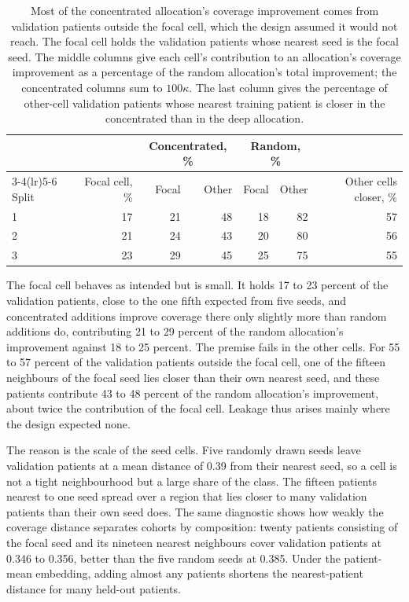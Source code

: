 \begin{table}[htbp]
\centering
\renewcommand{\arraystretch}{1.15}
\begin{tabular}{@{}lrrrrrr@{}}
\toprule
 & & \multicolumn{2}{c}{Concentrated, \%} & \multicolumn{2}{c}{Random, \%} & \\
\cmidrule(lr){3-4}\cmidrule(lr){5-6}
Split & Focal cell, \% & Focal & Other & Focal & Other & Other cells closer, \% \\
\midrule
1 & 17 & 21 & 48 & 18 & 82 & 57 \\
2 & 21 & 24 & 43 & 20 & 80 & 56 \\
3 & 23 & 29 & 45 & 25 & 75 & 55 \\
\bottomrule
\end{tabular}
\caption{Most of the concentrated allocation's coverage improvement comes from validation patients outside the focal cell, which the design assumed it would not reach. The focal cell holds the validation patients whose nearest seed is the focal seed. The middle columns give each cell's contribution to an allocation's coverage improvement as a percentage of the random allocation's total improvement; the concentrated columns sum to $100\kappa$. The last column gives the percentage of other-cell validation patients whose nearest training patient is closer in the concentrated than in the deep allocation.}
\label{tab:decomposition}
\end{table}

\noindent The focal cell behaves as intended but is small. It holds 17 to 23 percent of the validation patients, close to the one fifth expected from five seeds, and concentrated additions improve coverage there only slightly more than random additions do, contributing 21 to 29 percent of the random allocation's improvement against 18 to 25 percent. The premise fails in the other cells. For 55 to 57 percent of the validation patients outside the focal cell, one of the fifteen neighbours of the focal seed lies closer than their own nearest seed, and these patients contribute 43 to 48 percent of the random allocation's improvement, about twice the contribution of the focal cell. Leakage thus arises mainly where the design expected none.

The reason is the scale of the seed cells. Five randomly drawn seeds leave validation patients at a mean distance of 0.39 from their nearest seed, so a cell is not a tight neighbourhood but a large share of the class. The fifteen patients nearest to one seed spread over a region that lies closer to many validation patients than their own seed does. The same diagnostic shows how weakly the coverage distance separates cohorts by composition: twenty patients consisting of the focal seed and its nineteen nearest neighbours cover validation patients at 0.346 to 0.356, better than the five random seeds at 0.385. Under the patient-mean embedding, adding almost any patients shortens the nearest-patient distance for many held-out patients.

